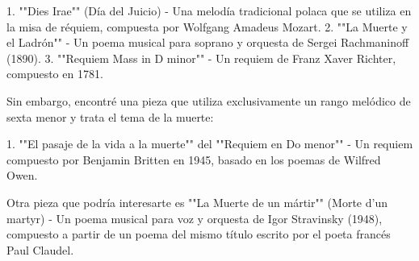 \begin{itemize}
1. ""Dies Irae"" (Día del Juicio) - Una melodía tradicional polaca que se utiliza en la misa de réquiem, compuesta por Wolfgang Amadeus Mozart.
2. ""La Muerte y el Ladrón"" - Un poema musical para soprano y orquesta de Sergei Rachmaninoff (1890).
3. ""Requiem Mass in D minor"" - Un requiem de Franz Xaver Richter, compuesto en 1781.

Sin embargo, encontré una pieza que utiliza exclusivamente un rango melódico de sexta menor y trata el tema de la muerte:

1. ""El pasaje de la vida a la muerte"" del ""Requiem en Do menor"" - Un requiem compuesto por Benjamin Britten en 1945, basado en los poemas de Wilfred Owen.

Otra pieza que podría interesarte es ""La Muerte de un mártir"" (Morte d'un martyr) - Un poema musical para voz y orquesta de Igor Stravinsky (1948), compuesto a partir de un poema del mismo título escrito por el poeta francés Paul Claudel.


\end{itemize}
